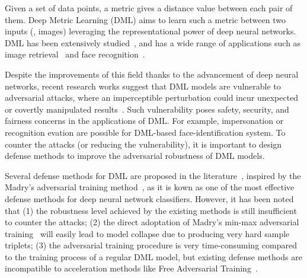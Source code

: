 \documentclass[10pt,twocolumn,letterpaper]{article}
\begin{document}

Given a set of data points, a metric gives a distance value between each pair
of them.
%
Deep Metric Learning (DML) aims to learn such a metric between two inputs (\eg,
images) leveraging the representational power of deep neural networks.
%
DML has been extensively studied~\cite{revisiting}, and has a
wide range of applications such
as image retrieval~\cite{imagesim2} and face recognition~\cite{facenet}.


Despite the improvements of this field thanks to the advancement of deep neural
networks, recent research works suggest that DML models are vulnerable to
adversarial attacks, where an imperceptible perturbation could incur unexpected
or covertly manipulated results~\cite{advrank,advorder}.
%
Such vulnerability poses safety, security, and fairness concerns in the
applications of DML.
%
For example, impersonation or recognition evation are possible for DML-based
face-identification system.
%
To counter the attacks (or reducing the vulnerability), it is important to
design defense methods to improve the adversarial robustness of DML models.

Several defense methods for DML are proposed in the
literature~\cite{advrank,robrank}, inspired by the Madry's adversarial training
method~\cite{madry}, as it is kown as one of the most effective defense methods
for deep neural network classifiers.
%
However, it has been noted that
%
(1) the robustness level achieved by the existing methods is still insufficient
to counter the attacks;
%
(2) the direct adoptation of Madry's min-max adversarial training~\cite{madry} will easily
lead to model collapse due to producing very hard sample triplets;
%
(3) the adversarial training procedure is very time-consuming compared to
the training process of a regular DML model, but existing defense methods
are incompatible to acceleration methods like Free Adversarial Training~\cite{freeat}.

%
%
%
\end{document}

